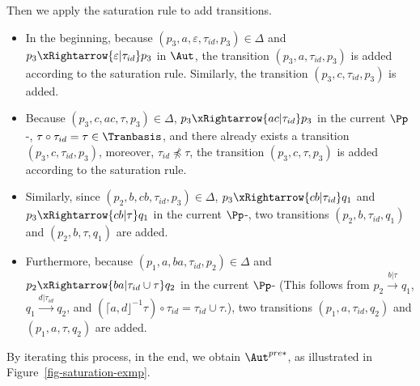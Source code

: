 \begin{example}
Then we apply the saturation rule to add transitions.
\begin{itemize}
\item In the beginning, because $(p_3, a, \varepsilon, \tau_{id}, p_3) \in \Delta$ and $p_3 \xRightarrow{\varepsilon | \tau_{id}} p_3$ in $\Aut$, the transition $(p_3, a, \tau_{id}, p_3)$ is added according to the saturation rule. Similarly, the transition $(p_3, c, \tau_{id}, p_3)$ is added. 
%
\item Because $(p_3, c, ac, \tau, p_3) \in \Delta$, $p_3 \xRightarrow{ac | \tau_{id}} p_3$  in the current $\Pp$-{\WOTrNFA}, $\tau \circ \tau_{id} = \tau \in \Tranbasis$, and 
 there already exists a transition $(p_3, c, \tau_{id}, p_3)$, moreover, $\tau_{id} \not \preceq \tau$, the transition $(p_3, c, \tau, p_3)$ is added according to the saturation rule. 
%
\item Similarly, since $(p_2, b, cb, \tau_{id}, p_3) \in \Delta$, $p_3 \xRightarrow{cb | \tau_{id}} q_1$ and $p_3 \xRightarrow{cb | \tau} q_1$ in the current $\Pp$-{\WOTrNFA}, two transitions $(p_2, b, \tau_{id}, q_1)$  and $(p_2, b, \tau, q_1)$ are added. 
%
\item Furthermore, because $(p_1, a, ba, \tau_{id}, p_2) \in \Delta$ and $p_2 \xRightarrow{ba | \tau_{id} \cup \tau} q_2$ in the current $\Pp$-{\WOTrNFA} (This follows from $p_2 \xrightarrow{b | \tau} q_1$, $q_1 \xrightarrow{d | \tau_{id}} q_2$, and $(\lceil a, d\rfloor^{-1} \tau) \circ \tau_{id} = \tau_{id} \cup \tau$.), two transitions $(p_1, a, \tau_{id}, q_2)$  and $(p_1, a, \tau, q_2)$ are added.
%
\end{itemize}
By iterating this process, in the end, we obtain $\Aut^{pre*}$, as illustrated in Figure~\ref{fig-saturation-exmp}.
\begin{figure}[htb]
    \centering

\end{figure}
\end{example}
